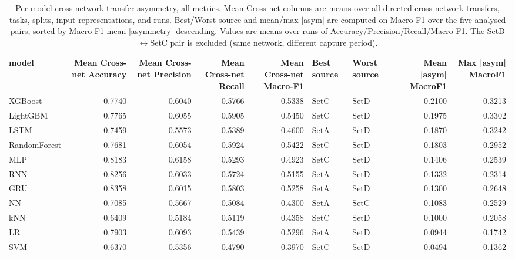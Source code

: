 \begin{table}
\caption{Per-model cross-network transfer asymmetry, all metrics. Mean Cross-net columns are means over all directed cross-network transfers, tasks, splits, input representations, and runs. Best/Worst source and mean/max $|$asym$|$ are computed on Macro-F1 over the five analysed pairs; sorted by Macro-F1 mean $|$asymmetry$|$ descending. Values are means over runs of Accuracy/Precision/Recall/Macro-F1. The SetB$\leftrightarrow$SetC pair is excluded (same network, different capture period).}
\label{tab:q4_appendix_per_model}
\begin{tabular}{lrrrrllrr}
\toprule
model & Mean Cross-net Accuracy & Mean Cross-net Precision & Mean Cross-net Recall & Mean Cross-net Macro-F1 & Best source & Worst source & Mean |asym| MacroF1 & Max |asym| MacroF1 \\
\midrule
XGBoost & 0.7740 & 0.6040 & 0.5766 & 0.5338 & SetC & SetD & 0.2100 & 0.3213 \\
LightGBM & 0.7765 & 0.6055 & 0.5905 & 0.5450 & SetC & SetD & 0.1975 & 0.3302 \\
LSTM & 0.7459 & 0.5573 & 0.5389 & 0.4600 & SetA & SetD & 0.1870 & 0.3242 \\
RandomForest & 0.7681 & 0.6054 & 0.5924 & 0.5422 & SetC & SetD & 0.1803 & 0.2952 \\
MLP & 0.8183 & 0.6158 & 0.5293 & 0.4923 & SetC & SetD & 0.1406 & 0.2539 \\
RNN & 0.8256 & 0.6033 & 0.5724 & 0.5155 & SetA & SetD & 0.1332 & 0.2314 \\
GRU & 0.8358 & 0.6015 & 0.5803 & 0.5258 & SetA & SetD & 0.1300 & 0.2648 \\
NN & 0.7085 & 0.5667 & 0.5084 & 0.4300 & SetA & SetC & 0.1083 & 0.2529 \\
kNN & 0.6409 & 0.5184 & 0.5119 & 0.4358 & SetC & SetD & 0.1000 & 0.2058 \\
LR & 0.7903 & 0.6093 & 0.5439 & 0.5296 & SetA & SetD & 0.0944 & 0.1742 \\
SVM & 0.6370 & 0.5356 & 0.4790 & 0.3970 & SetC & SetD & 0.0494 & 0.1362 \\
\bottomrule
\end{tabular}
\end{table}
